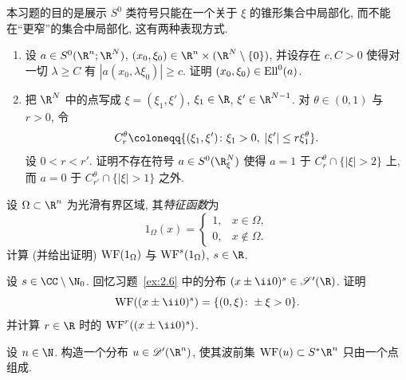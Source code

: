 \begin{exer}[为什么是锥形集合?]\label{ex:6.2}
本习题的目的是展示 $S^0$ 类符号只能在一个关于 $\xi$ 的锥形集合中局部化, 而不能在``更窄''的集合中局部化, 这有两种表现方式.
\begin{enumerate}
    \item 设 $a \in S^0(\R^n; \R^N)$, $(x_0, \xi_0) \in \R^n \times (\R^N \setminus \{0\})$, 并设存在 $c, C > 0$ 使得对一切 $\lambda \ge C$ 有 $|a(x_0, \lambda\xi_0)| \ge c$. 证明 $(x_0, \xi_0) \in \operatorname{Ell}^0(a)$.
    \item 把 $\R^N$ 中的点写成 $\xi = (\xi_1, \xi')$, $\xi_1 \in \R$, $\xi' \in \R^{N-1}$. 对 $\theta \in (0, 1)$ 与 $r > 0$, 令
    \begin{equation}\label{eq:6.122}
        C^\theta_r \defeq \{(\xi_1, \xi') \colon \xi_1 > 0, \; |\xi'| \le r\xi_1^\theta\}.
    \end{equation}
    设 $0 < r < r'$. 证明不存在符号 $a \in S^0(\R^N_\xi)$ 使得 $a = 1$ 于 $C^\theta_r \cap \{|\xi| > 2\}$ 上, 而 $a = 0$ 于 $C^\theta_{r'} \cap \{|\xi| > 1\}$ 之外.
\end{enumerate}
\end{exer}

\begin{exer}[特征函数的波前集]\label{ex:6.3}
设 $\Omega \subset \R^n$ 为光滑有界区域, 其\emph{特征函数}为
\begin{equation}\label{eq:6.123}
    1_\Omega(x) = \begin{cases} 1, & x \in \Omega, \\ 0, & x \notin \Omega. \end{cases}
\end{equation}
计算 (并给出证明) $\operatorname{WF}(1_\Omega)$ 与 $\operatorname{WF}^s(1_\Omega)$, $s \in \R$.
\end{exer}

\begin{exer}[$\pm \ii 0$ 型分布]\label{ex:6.4}
设 $s \in \CC \setminus \N_0$. 回忆习题~\ref{ex:2.6} 中的分布 $(x \pm \ii 0)^s \in \mathscr{S}'(\R)$. 证明
\begin{equation}\label{eq:6.124}
    \WF((x \pm \ii 0)^s) = \{(0, \xi) \colon \pm\xi > 0\}.
\end{equation}
并计算 $r \in \R$ 时的 $\WF^r((x \pm \ii 0)^s)$.
\end{exer}

\begin{exer}[具有特殊波前集的分布]\label{ex:6.5}
设 $n \in \N$. 构造一个分布 $u \in \Distr(\R^n)$, 使其波前集 $\WF(u) \subset S^* \R^n$ 只由一个点组成.
\end{exer}

